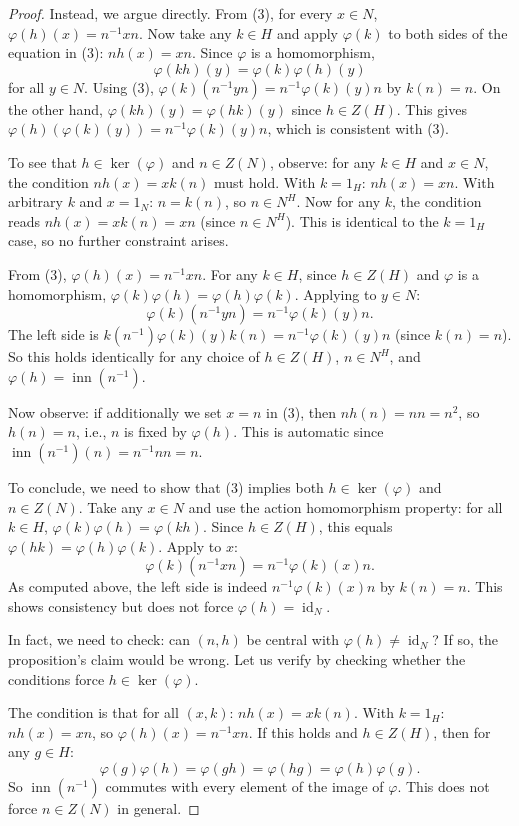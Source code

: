 \begin{proof}
    Instead, we argue directly. From (3), for every $x \in N$, $\varphi(h)(x) = n^{-1}xn$. Now take any $k \in H$ and apply $\varphi(k)$ to both sides of the equation in (3): $n h(x) = xn$. Since $\varphi$ is a homomorphism,
    $$\varphi(kh)(y) = \varphi(k)\varphi(h)(y)$$
    for all $y \in N$. Using (3), $\varphi(k)(n^{-1}yn) = n^{-1}\varphi(k)(y)n$ by $k(n) = n$. On the other hand, $\varphi(kh)(y) = \varphi(hk)(y)$ since $h \in Z(H)$. This gives $\varphi(h)(\varphi(k)(y)) = n^{-1}\varphi(k)(y)n$, which is consistent with (3).

    To see that $h \in \ker(\varphi)$ and $n \in Z(N)$, observe: for any $k \in H$ and $x \in N$, the condition $n h(x) = x k(n)$ must hold. With $k = 1_H$: $nh(x) = xn$. With arbitrary $k$ and $x = 1_N$: $n = k(n)$, so $n \in N^H$. Now for any $k$, the condition reads $nh(x) = xk(n) = xn$ (since $n \in N^H$). This is identical to the $k = 1_H$ case, so no further constraint arises.

    From (3), $\varphi(h)(x) = n^{-1}xn$. For any $k \in H$, since $h \in Z(H)$ and $\varphi$ is a homomorphism, $\varphi(k)\varphi(h) = \varphi(h)\varphi(k)$. Applying to $y \in N$:
    $$\varphi(k)(n^{-1}yn) = n^{-1}\varphi(k)(y)n.$$
    The left side is $k(n^{-1})\varphi(k)(y)k(n) = n^{-1}\varphi(k)(y)n$ (since $k(n) = n$). So this holds identically for any choice of $h \in Z(H)$, $n \in N^H$, and $\varphi(h) = \operatorname{inn}(n^{-1})$.

    Now observe: if additionally we set $x = n$ in (3), then $n h(n) = nn = n^2$, so $h(n) = n$, i.e., $n$ is fixed by $\varphi(h)$. This is automatic since $\operatorname{inn}(n^{-1})(n) = n^{-1}nn = n$.

    To conclude, we need to show that (3) implies both $h \in \ker(\varphi)$ and $n \in Z(N)$. Take any $x \in N$ and use the action homomorphism property: for all $k \in H$, $\varphi(k)\varphi(h) = \varphi(kh)$. Since $h \in Z(H)$, this equals $\varphi(hk) = \varphi(h)\varphi(k)$. Apply to $x$:
    $$\varphi(k)(n^{-1}xn) = n^{-1}\varphi(k)(x)n.$$
    As computed above, the left side is indeed $n^{-1}\varphi(k)(x)n$ by $k(n) = n$. This shows consistency but does not force $\varphi(h) = \operatorname{id}_N$.

    In fact, we need to check: can $(n,h)$ be central with $\varphi(h) \neq \operatorname{id}_N$? If so, the proposition's claim would be wrong. Let us verify by checking whether the conditions force $h \in \ker(\varphi)$.

    The condition is that for all $(x,k)$: $n h(x) = x k(n)$. With $k=1_H$: $nh(x) = xn$, so $\varphi(h)(x) = n^{-1}xn$. If this holds and $h \in Z(H)$, then for any $g \in H$:
    $$\varphi(g)\varphi(h) = \varphi(gh) = \varphi(hg) = \varphi(h)\varphi(g).$$
    So $\operatorname{inn}(n^{-1})$ commutes with every element of the image of $\varphi$. This does not force $n \in Z(N)$ in general.


\end{proof}

